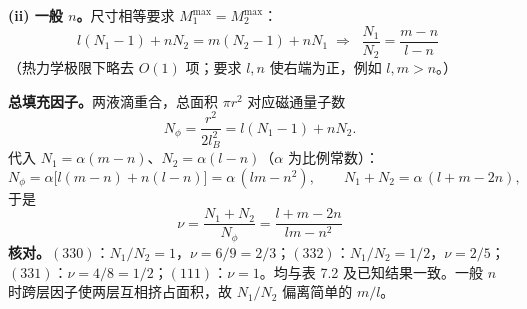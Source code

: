 \textbf{(ii) 一般 $n$。}尺寸相等要求 $M_1^{\max}=M_2^{\max}$：
\begin{equation*}
l(N_1-1)+nN_2=m(N_2-1)+nN_1
\;\Longrightarrow\;
\boxed{\;\frac{N_1}{N_2}=\frac{m-n}{l-n}\;}
\end{equation*}
（热力学极限下略去 $O(1)$ 项；要求 $l,n$ 使右端为正，例如 $l,m>n$。）

\textbf{总填充因子。}两液滴重合，总面积 $\pi r^2$ 对应磁通量子数
\begin{equation*}
N_\phi=\frac{r^2}{2l_B^2}=l(N_1-1)+nN_2 .
\end{equation*}
代入 $N_1=\alpha(m-n)$、$N_2=\alpha(l-n)$（$\alpha$ 为比例常数）：
\begin{equation*}
N_\phi=\alpha\big[l(m-n)+n(l-n)\big]=\alpha\,(lm-n^2),
\qquad
N_1+N_2=\alpha\,(l+m-2n),
\end{equation*}
于是
\begin{equation*}
\boxed{\;\nu=\frac{N_1+N_2}{N_\phi}=\frac{l+m-2n}{lm-n^2}\;}
\end{equation*}
\textbf{核对。}$(330)$：$N_1/N_2=1$，$\nu=6/9=2/3$；$(332)$：$N_1/N_2=1/2$，$\nu=2/5$；$(331)$：$\nu=4/8=1/2$；$(111)$：$\nu=1$。均与表 7.2 及已知结果一致。一般 $n$ 时跨层因子使两层互相挤占面积，故 $N_1/N_2$ 偏离简单的 $m/l$。

